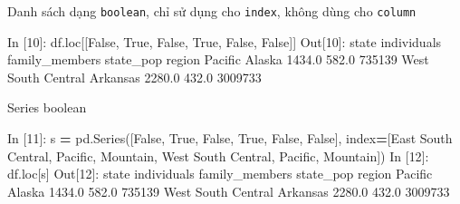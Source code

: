 \documentclass[
]{book}
\newenvironment{Shaded}{\begin{snugshade}}{\end{snugshade}}
\newcommand{\DecValTok}[1]{\textcolor[rgb]{0.00,0.00,0.81}{#1}}
\newcommand{\FloatTok}[1]{\textcolor[rgb]{0.00,0.00,0.81}{#1}}
\newcommand{\NormalTok}[1]{#1}
\newcommand{\OperatorTok}[1]{\textcolor[rgb]{0.81,0.36,0.00}{\textbf{#1}}}
\newcommand{\StringTok}[1]{\textcolor[rgb]{0.31,0.60,0.02}{#1}}
\newcommand{\VariableTok}[1]{\textcolor[rgb]{0.00,0.00,0.00}{#1}}
\begin{document}
Danh sách dạng \texttt{boolean}, chỉ sử dụng cho \texttt{index}, không dùng cho \texttt{column}

\begin{Shaded}
\begin{Highlighting}[]
\NormalTok{In [}\DecValTok{10}\NormalTok{]: df.loc[[}\VariableTok{False}\NormalTok{, }\VariableTok{True}\NormalTok{, }\VariableTok{False}\NormalTok{, }\VariableTok{True}\NormalTok{, }\VariableTok{False}\NormalTok{, }\VariableTok{False}\NormalTok{]]}
\NormalTok{Out[}\DecValTok{10}\NormalTok{]:}
\NormalTok{                       state  individuals  family\_members  state\_pop}
\NormalTok{region                                                              }
\NormalTok{Pacific               Alaska       }\FloatTok{1434.0}           \FloatTok{582.0}     \DecValTok{735139}
\NormalTok{West South Central  Arkansas       }\FloatTok{2280.0}           \FloatTok{432.0}    \DecValTok{3009733}
\end{Highlighting}
\end{Shaded}

Series boolean

\begin{Shaded}
\begin{Highlighting}[]
\NormalTok{In [}\DecValTok{11}\NormalTok{]: s }\OperatorTok{=}\NormalTok{ pd.Series([}\VariableTok{False}\NormalTok{, }\VariableTok{True}\NormalTok{, }\VariableTok{False}\NormalTok{, }\VariableTok{True}\NormalTok{, }\VariableTok{False}\NormalTok{, }\VariableTok{False}\NormalTok{],}
\NormalTok{              index}\OperatorTok{=}\NormalTok{[}\StringTok{\textquotesingle{}East South Central\textquotesingle{}}\NormalTok{, }\StringTok{\textquotesingle{}Pacific\textquotesingle{}}\NormalTok{, }\StringTok{\textquotesingle{}Mountain\textquotesingle{}}\NormalTok{, }\StringTok{\textquotesingle{}West South Central\textquotesingle{}}\NormalTok{, }\StringTok{\textquotesingle{}Pacific\textquotesingle{}}\NormalTok{, }\StringTok{\textquotesingle{}Mountain\textquotesingle{}}\NormalTok{])}
\NormalTok{In [}\DecValTok{12}\NormalTok{]: df.loc[s]}
\NormalTok{Out[}\DecValTok{12}\NormalTok{]:}
\NormalTok{                       state  individuals  family\_members  state\_pop}
\NormalTok{region                                                              }
\NormalTok{Pacific               Alaska       }\FloatTok{1434.0}           \FloatTok{582.0}     \DecValTok{735139}
\NormalTok{West South Central  Arkansas       }\FloatTok{2280.0}           \FloatTok{432.0}    \DecValTok{3009733}
\end{Highlighting}
\end{Shaded}
\end{document}
